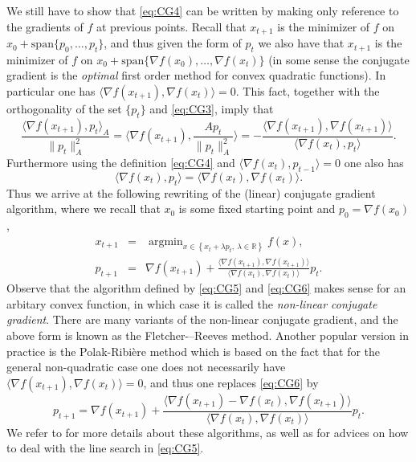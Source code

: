 \documentclass[openany]{now}
\newcommand{\R}{\mathbb{R}}
\newcommand{\argmin}{\mathop{\mathrm{argmin}}}
\begin{document}
We still have to show that \eqref{eq:CG4} can be written by making only reference to the gradients of $f$ at previous points. Recall that $x_{t+1}$ is the minimizer of $f$ on $x_0 + \mathrm{span}\{p_0, \hdots, p_t\}$, and thus given the form of $p_t$ we also have that $x_{t+1}$ is the minimizer of $f$ on $x_0 + \mathrm{span}\{\nabla f(x_0), \hdots, \nabla f(x_t)\}$ (in some sense the conjugate gradient is the {\em optimal} first order method for convex quadratic functions). In particular one has $\langle \nabla f(x_{t+1}) , \nabla f(x_t) \rangle = 0$. This fact, together with the orthogonality of the set $\{p_t\}$ and \eqref{eq:CG3}, imply that
$$\frac{\langle \nabla f(x_{t+1}) , p_{t} \rangle_A}{\|p_t\|_A^2} = \langle \nabla f(x_{t+1}) , \frac{A p_{t}}{\|p_t\|_A^2}  \rangle = - \frac{\langle \nabla f(x_{t+1})  , \nabla f(x_{t+1}) \rangle}{\langle \nabla f(x_{t})  , p_t \rangle} .$$
Furthermore using the definition \eqref{eq:CG4} and $\langle \nabla f(x_t) , p_{t-1} \rangle = 0$ one also has
$$\langle \nabla f(x_t), p_t \rangle = \langle \nabla f(x_t) , \nabla f(x_t) \rangle .$$
Thus we arrive at the following rewriting of the (linear) conjugate gradient algorithm, where we recall that $x_0$ is some fixed starting point and $p_0 = \nabla f(x_0)$,
\begin{eqnarray}
x_{t+1} & = & \argmin_{x \in \left\{x_t + \lambda p_t, \ \lambda \in \R \right\}} f(x) , \label{eq:CG5} \\
p_{t+1} & = & \nabla f(x_{t+1}) + \frac{\langle \nabla f(x_{t+1})  , \nabla f(x_{t+1}) \rangle}{\langle \nabla f(x_{t})  , \nabla f(x_t) \rangle} p_t . \label{eq:CG6}
\end{eqnarray}
Observe that the algorithm defined by \eqref{eq:CG5} and \eqref{eq:CG6} makes sense for an arbitary convex function, in which case it is called the {\em non-linear conjugate gradient}. There are many variants of the non-linear conjugate gradient, and the above form is known as the Fletcher-–Reeves method. Another popular version in practice is the Polak-Ribi{\`e}re method which is based on the fact that for the general non-quadratic case one does not necessarily have $\langle \nabla f(x_{t+1}) , \nabla f(x_t) \rangle = 0$, and thus one replaces \eqref{eq:CG6} by
$$p_{t+1} = \nabla f(x_{t+1}) + \frac{\langle \nabla f(x_{t+1})  - \nabla f(x_t), \nabla f(x_{t+1}) \rangle}{\langle \nabla f(x_{t})  , \nabla f(x_t) \rangle} p_t .$$
We refer to \cite{NW06} for more details about these algorithms, as well as for advices on how to deal with the line search in \eqref{eq:CG5}.
\end{document}

